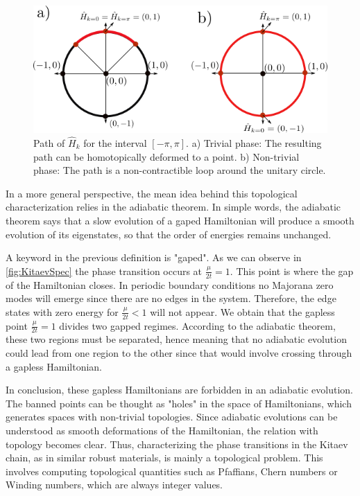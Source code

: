 \begin{figure}[t]
    \centering
    \includegraphics[scale=0.8]{IMAGES/Majorana/Topological.png}
    \caption{ \label{fig:topological}  Path of $\hat{H}_k$ for the interval $[ -\pi, \pi ]$. a) Trivial phase: The resulting path can be homotopically deformed to a point. b) Non-trivial phase: The path is a non-contractible loop around the unitary circle. \protect {}} 
\end{figure}


In a more general perspective, the mean idea behind this topological characterization relies in the adiabatic theorem.  In simple words, the adiabatic theorem says that a slow evolution of a gaped Hamiltonian will produce a smooth evolution of its  eigenstates, so that the order of energies remains unchanged. 

A keyword in the previous definition is "gaped". As we can observe in  \ref{fig:KitaevSpec} the phase transition occurs at $\frac{\mu}{2t}=1$. This point is where  the gap of the Hamiltonian closes. In periodic boundary conditions no Majorana zero modes will emerge since there are no edges in the system. Therefore, the edge states with zero energy for $\frac{\mu}{2t}<1$ will not appear. We obtain that the gapless point $\frac{\mu}{2t}=1$ divides two gapped regimes. According to the adiabatic theorem, these two regions must be separated, hence meaning that no adiabatic evolution could lead from one region to the other since that would involve crossing  through a gapless Hamiltonian. 


In conclusion, these gapless Hamiltonians are forbidden in an adiabatic evolution. The banned points can be thought as "holes" in the space of Hamiltonians, which generates spaces with non-trivial topologies. Since adiabatic evolutions can be understood as smooth deformations of the Hamiltonian, the relation with topology becomes clear.  Thus, characterizing the phase transitions in the Kitaev chain, as in similar robust materials,  is mainly a topological problem. This involves computing topological quantities such as Pfaffians, Chern numbers or Winding numbers, which are always integer values. 

